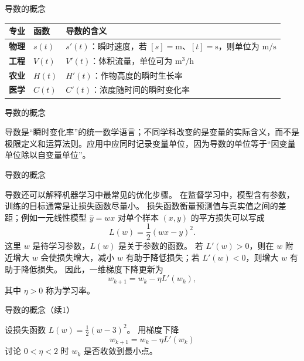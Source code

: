 \documentclass[aspectratio=169,10pt,fontset=fandol]{ctexbeamer}
\begin{document}
\begin{frame}[t,fragile]{导数的概念}
\normalsize
{\normalsize
\begin{center}
\small
\begin{tabularx}{\textwidth}{>{\bfseries}p{1.4cm} p{2.0cm} X}
\toprule
专业 & 函数 & 导数的含义 \\
\midrule
物理 & $s(t)$ & $s'(t)$：瞬时速度，若 $[s]=\mathrm m$、$[t]=\mathrm s$，则单位为 $\mathrm{m/s}$ \\
工程 & $V(t)$ & $V'(t)$：体积流量，单位可为 $\mathrm{m^3/h}$ \\
农业 & $H(t)$ & $H'(t)$：作物高度的瞬时生长率 \\
医学 & $C(t)$ & $C'(t)$：浓度随时间的瞬时变化率 \\
\bottomrule
\end{tabularx}
\end{center}
}
\end{frame}
\begin{frame}[t,fragile]{导数的概念}
\normalsize
{\normalsize
导数是“瞬时变化率”的统一数学语言；不同学科改变的是变量的实际含义，而不是极限定义和运算法则。应用中应同时记录变量单位，因为导数的单位等于“因变量单位除以自变量单位”。


}
\end{frame}
\begin{frame}[t,fragile]{导数的概念}
\small
{\small
\begin{application}[导数与梯度下降的基本思想]
	
	导数还可以解释机器学习中最常见的优化步骤。 在监督学习中，模型含有参数，训练的目标通常是让损失函数尽量小。 损失函数衡量预测值与真实值之间的差距；例如一元线性模型 $\hat y=wx$ 对单个样本 $(x,y)$ 的平方损失可以写成
	\[
	L(w)=\frac12(wx-y)^2.
	\]
	这里 $w$ 是待学习参数，$L(w)$ 是关于参数的函数。 若 $L'(w)>0$，则在 $w$ 附近增大 $w$ 会使损失增大，减小 $w$ 有助于降低损失；若 $L'(w)<0$，则增大 $w$ 有助于降低损失。 因此，一维梯度下降更新为
	\[
	w_{k+1}=w_k-\eta L'(w_k),
	\]
	其中 $\eta>0$ 称为学习率。
	

\end{application}
}
\end{frame}
\begin{frame}[t,fragile]{导数的概念（续1）}
\normalsize
{\normalsize
\begin{application}[导数与梯度下降的基本思想]
	\begin{example}
		设损失函数 $L(w)=\frac12(w-3)^2$。 用梯度下降
		\[
		w_{k+1}=w_k-\eta L'(w_k)
		\]
		讨论 $0<\eta<2$ 时 $w_k$ 是否收敛到最小点。
	\end{example}
\end{application}
}
\end{frame}
\end{document}
